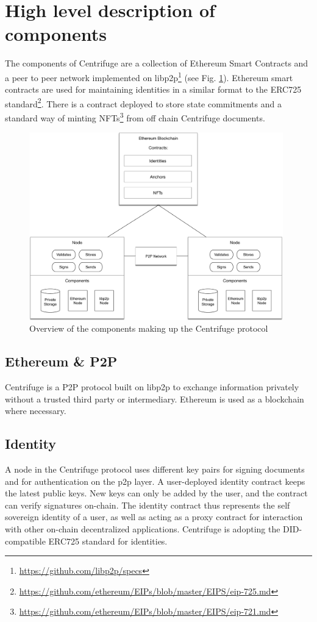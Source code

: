 \section{High level description of components}

The components of Centrifuge are a collection of Ethereum Smart Contracts and a peer to peer network implemented on libp2p\footnote{\url{https://github.com/libp2p/specs}} (see Fig. \ref{fig:high_level_architecture}). Ethereum smart contracts are used for maintaining identities in a similar format to the ERC725 standard\footnote{\url{https://github.com/ethereum/EIPs/blob/master/EIPS/eip-725.md}}. There is a contract deployed to store state commitments and a standard way of minting NFTs\footnote{\url{https://github.com/ethereum/EIPs/blob/master/EIPS/eip-721.md}} from off chain Centrifuge documents.
\begin{figure}[thpb]
  \centering
  \includegraphics[width=11cm]{img/high_level_architecture.pdf}
  \caption{Overview of the components making up the Centrifuge protocol} 
  \label{fig:high_level_architecture}
\end{figure}

\subsection{Ethereum \& P2P}
Centrifuge is a P2P protocol built on libp2p to exchange information privately without a trusted third party or intermediary. Ethereum is used as a blockchain where necessary.

\subsection{Identity}
A node in the Centrifuge protocol uses different key pairs for signing documents and for authentication on the p2p layer. A user-deployed identity contract keeps the latest public keys. New keys can only be added by the user, and the contract can verify signatures on-chain. The identity contract thus represents the self sovereign identity of a user, as well as acting as a proxy contract for interaction with other on-chain decentralized applications. Centrifuge is adopting the DID-compatible ERC725 standard for identities.

